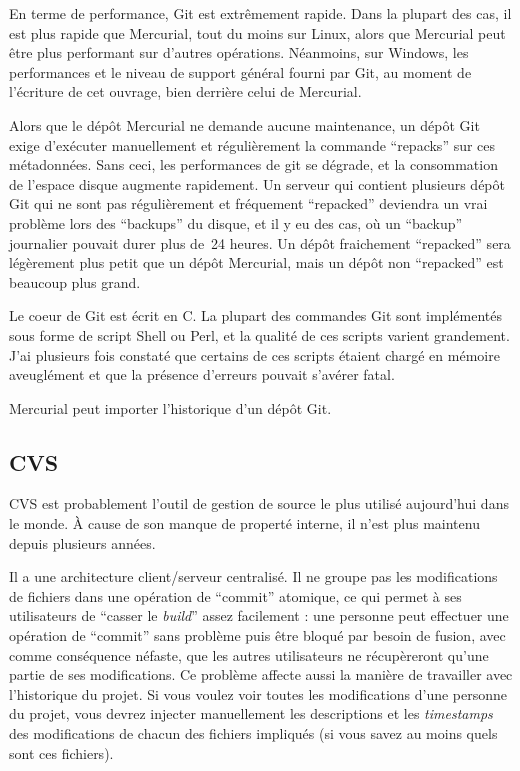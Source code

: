 En terme de performance, Git est extrêmement rapide. Dans la plupart des
cas, il est plus rapide que Mercurial, tout du moins sur Linux, alors que 
Mercurial peut être plus performant sur d'autres opérations. Néanmoins, sur
Windows, les performances et le niveau de support général fourni par Git, 
au moment de l'écriture de cet ouvrage, bien derrière celui de Mercurial.

Alors que le dépôt Mercurial ne demande aucune maintenance, un dépôt Git
exige d'exécuter manuellement et régulièrement la commande ``repacks'' sur
ces métadonnées. Sans ceci, les performances de git se dégrade, et la 
consommation de l'espace disque augmente rapidement. Un serveur qui contient
plusieurs dépôt Git qui ne sont pas régulièrement et fréquement ``repacked''
deviendra un vrai problème lors des ``backups'' du disque, et il y eu des
cas, où un ``backup'' journalier pouvait durer plus de~24 heures. Un dépôt
fraichement ``repacked'' sera légèrement plus petit que un dépôt Mercurial,
mais un dépôt non ``repacked'' est beaucoup plus grand.

Le coeur de Git est écrit en C. La plupart des commandes Git sont implémentés
sous forme de script Shell ou Perl, et la qualité de ces scripts varient
grandement. J'ai plusieurs fois constaté que certains de ces scripts étaient
chargé en mémoire aveuglément et que la présence d'erreurs pouvait s'avérer
fatal.

Mercurial peut importer l'historique d'un dépôt Git.

\subsection{CVS}

CVS est probablement l'outil de gestion de source le plus utilisé aujourd'hui
dans le monde. À cause de son manque de properté interne, il n'est plus 
maintenu depuis plusieurs années.

Il a une architecture client/serveur centralisé. Il ne groupe pas les
modifications de fichiers dans une opération de ``commit'' atomique, ce
qui permet à ses utilisateurs de ``casser le \textit{build}'' assez
facilement : une personne peut effectuer une opération de ``commit'' 
sans problème puis être bloqué par besoin de fusion, avec comme conséquence
néfaste, que les autres utilisateurs ne récupèreront qu'une partie de ses
modifications. Ce problème affecte aussi la manière de travailler avec 
l'historique du projet. Si vous voulez voir toutes les modifications d'une
personne du projet, vous devrez injecter manuellement les descriptions et les
\textit{timestamps} des modifications de chacun des fichiers impliqués (si
vous savez au moins quels sont ces fichiers).


